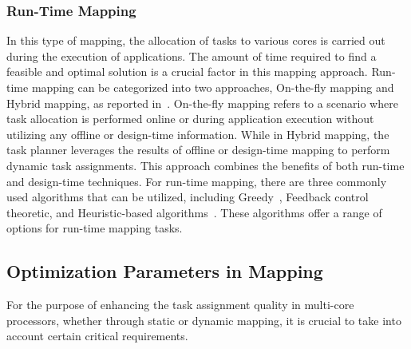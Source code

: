 \subsubsection{Run-Time Mapping} %
In this type of mapping, the allocation of tasks to various cores is carried out during the execution of applications. The amount of time required to find a feasible and optimal solution is a crucial factor in this mapping approach. Run-time mapping can be categorized into two approaches, On-the-fly mapping and Hybrid mapping, as reported in~\cite{singh2013mapping, gupta2021mapping}. On-the-fly mapping refers to a scenario where task allocation is performed online or during application execution without utilizing any offline or design-time information. While in Hybrid mapping, the task planner leverages the results of offline or design-time mapping to perform dynamic task assignments. This approach combines the benefits of both run-time and design-time techniques.
For run-time mapping, there are three commonly used algorithms that can be utilized, including Greedy~\cite{carvalho2007heuristics}, Feedback control theoretic, and Heuristic-based algorithms~\cite{gupta2021mapping}. These algorithms offer a range of options for run-time mapping tasks.



\subsection{Optimization Parameters in Mapping}\label{optimization}
For the purpose of enhancing the task assignment quality in multi-core processors, whether through static or dynamic mapping, it is crucial to take into account certain critical requirements.






